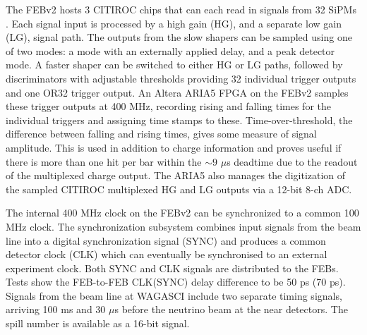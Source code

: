 The FEBv2 hosts 3 CITIROC chips that can each read in signals from 32 SiPMs \cite{Fleury:2014hfa}.
Each signal input is processed by a high gain (HG), and a separate low gain (LG), signal path.
The outputs from the slow shapers can be sampled using one of two modes: a mode with an externally applied delay, and a peak detector mode. A faster shaper can be switched to either HG or LG paths, followed by discriminators with adjustable thresholds providing 32 individual trigger outputs and one OR32 trigger output. An Altera ARIA5 FPGA on the FEBv2 samples these trigger outputs at 400 MHz, recording rising and falling times for the individual triggers and assigning time stamps to these. 
Time-over-threshold, the difference between falling and rising times, gives some measure of signal amplitude. This is used in addition to charge information and proves useful if there is more than one hit per bar within the $\sim9$ $\mu$s deadtime due to the readout of the multiplexed charge output.
The ARIA5 also manages the digitization of the sampled CITIROC multiplexed HG and LG outputs via a 12-bit 8-ch ADC. 


The internal 400 MHz clock on the FEBv2 can be synchronized to a common 100 MHz clock. The synchronization subsystem combines input signals from the beam line into a digital synchronization signal (SYNC) and produces a common detector clock (CLK) which can eventually be synchronised to an external experiment clock. Both SYNC and CLK signals are distributed to the FEBs. Tests show the FEB-to-FEB CLK(SYNC) delay difference to be 50 ps (70 ps). Signals from the beam line at WAGASCI include two separate timing signals, arriving 100 ms and 30 $\mu$s before the neutrino beam at the near detectors. The spill number is available as a 16-bit signal. 

